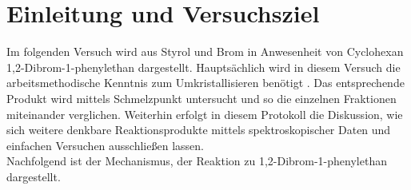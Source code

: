 \section{Einleitung und Versuchsziel}
\label{sec:aufgabenstellung}

Im folgenden Versuch wird aus Styrol und Brom in Anwesenheit von Cyclohexan 1,2-Dibrom-1-phenylethan dargestellt. Hauptsächlich wird in diesem Versuch die arbeitsmethodische Kenntnis zum Umkristallisieren benötigt . Das entsprechende Produkt wird mittels Schmelzpunkt untersucht und so die einzelnen Fraktionen miteinander verglichen. Weiterhin erfolgt in diesem Protokoll die Diskussion, wie sich weitere denkbare Reaktionsprodukte mittels spektroskopischer Daten und einfachen Versuchen ausschließen lassen.\\
Nachfolgend ist der Mechanismus, der Reaktion zu 1,2-Dibrom-1-phenylethan dargestellt.

